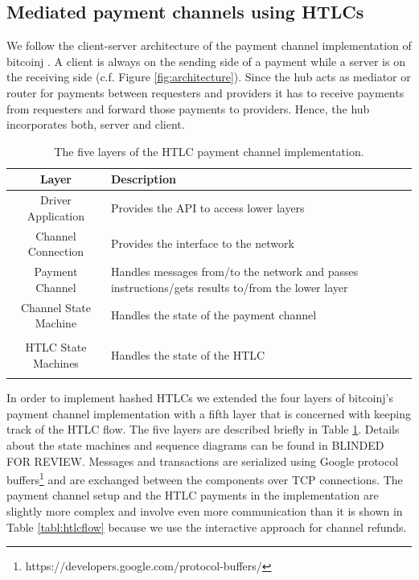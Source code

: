 \documentclass[10pt,journal,compsoc]{IEEEtran}
\newcommand\tabhead[1]{\small\textbf{#1}}
\begin{document}
\subsection{Mediated payment channels using HTLCs}

We follow the client-server architecture of the payment channel implementation of bitcoinj \cite{BitcoinjPC}. A client is always on the sending side of a payment while a server is on the receiving side (c.f. Figure \ref{fig:architecture}). Since the hub acts as mediator or router for payments between requesters and providers it has to receive payments from requesters and forward those payments to providers. Hence, the hub incorporates both, server and client.

\begin{table}
  \centering
    \caption{The five layers of the HTLC payment channel implementation.}
  \begin{tabular}{|c|l|}
    \hline
    \tabhead{Layer} &
    \tabhead{Description} \\
    \hline
    Driver Application & \multicolumn{1}{|p{0.5\columnwidth}|}{Provides the API to access lower layers}\\
    \hline
    Channel Connection & \multicolumn{1}{|p{0.5\columnwidth}|}{Provides the interface to the network}\\
    \hline
    Payment Channel & \multicolumn{1}{|p{0.5\columnwidth}|}{Handles messages from/to the network and passes instructions/gets results to/from the lower layer}\\
    \hline
    Channel State Machine & \multicolumn{1}{|p{0.5\columnwidth}|}{Handles the state of the payment channel}\\\\
    \hline
    HTLC State Machines & \multicolumn{1}{|p{0.5\columnwidth}|}{Handles the state of the HTLC}\\\\
    \hline
  \end{tabular}
  \label{tbl:layers}
\end{table}

In order to implement hashed HTLCs we extended the four layers of bitcoinj's payment channel implementation with a fifth layer that is concerned with keeping track of the HTLC flow. The five layers are described briefly in Table \ref{tbl:layers}. Details about the state machines and sequence diagrams can be found in BLINDED FOR REVIEW.
Messages and transactions are serialized using Google protocol buffers\footnote{https://developers.google.com/protocol-buffers/} and are exchanged between the components over TCP connections. The payment channel setup and the HTLC payments in the implementation are slightly more complex and involve even more communication than it is shown in Table \ref{tabl:htlcflow} because we use the interactive approach for channel refunds. 
\end{document}
